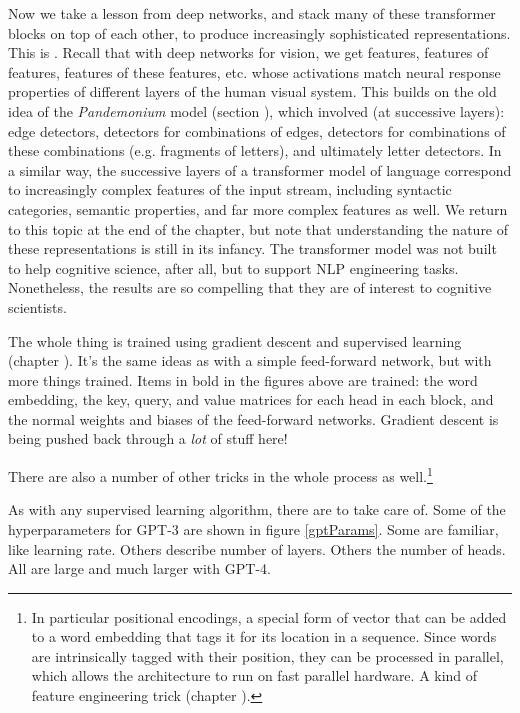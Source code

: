 Now we take a lesson from deep networks, and stack many of these transformer blocks on top of each other, to produce increasingly sophisticated representations.  This is . Recall that with deep networks for vision, we get features, features of features, features of these features, etc. whose activations match neural response properties of different layers of the human visual system. This builds on the old idea of the \emph{Pandemonium} model (section ), which involved (at successive layers): edge detectors, detectors for combinations of edges, detectors for combinations of these combinations (e.g. fragments of letters), and ultimately letter detectors. In a similar way, the successive layers of a transformer model of language correspond to increasingly complex features of the input stream, including syntactic categories, semantic properties, and far more complex features as well. We return to this topic at the end of the chapter, but note that understanding the nature of these representations is still in its infancy. The transformer model was not built to help cognitive science, after all, but to support NLP engineering tasks. Nonetheless, the results are so compelling that they are of interest to cognitive scientists.

The whole thing is trained using gradient descent and supervised learning (chapter ). It's the same ideas as with a simple feed-forward network, but with more things trained. Items in bold in the figures above are trained: the word embedding, the key, query, and value matrices for each head  in each block, and the normal weights and biases of the feed-forward networks.  Gradient descent is being pushed back through a \emph{lot} of stuff here!

There are also a number of other tricks in the whole process as well.\footnote{In particular positional encodings, a special form of vector that can be added to a word embedding that tags it for its location in a sequence. Since words are intrinsically tagged with their position, they can be processed in parallel, which allows the architecture to run on fast parallel hardware. A kind of feature engineering trick (chapter ).  }

As with any supervised learning algorithm, there are  to take care of. Some of the hyperparameters for GPT-3 are shown in figure \ref{gptParams}. Some are familiar, like learning rate. Others describe number of layers. Others the number of heads. All are large and much larger with GPT-4.

